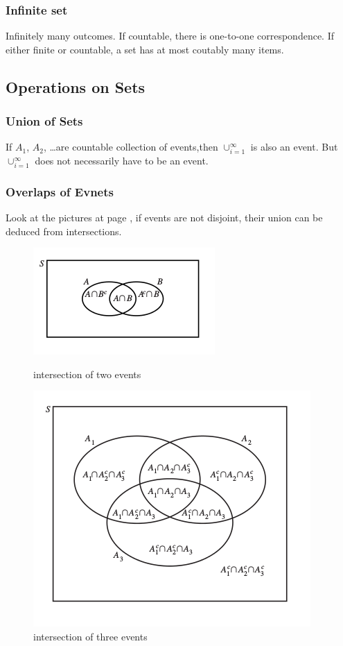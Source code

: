 \documentclass{book}
\begin{document}
			\subsubsection{Infinite set}
			Infinitely many outcomes.  If countable, there 
			is one-to-one correspondence.  If either finite or countable, 
			a set has at most coutably many items.  

		\subsection{Operations on Sets}
			\subsubsection{Union of Sets}
			If $A_1$, $A_2$, \ldots  are countable collection of events,then 
			$\cup_{i=1}^{\infty}$ is also an event.  But $\cup_{i=1}^{\infty}$ 
			does not necessarily have to be an event.  

			\subsubsection{Overlaps of Evnets}
			Look at the pictures at page \pageref{fig:intersection_1}, 
			if events are not disjoint, their union can be deduced from intersections.  
			\begin{figure}[h]
				\centering
				\includegraphics[scale=0.5]{PartitionByTwo}
				\caption{intersection of two events}
				\label{fig:intersection_1}
				\includegraphics[scale=0.5]{PartitionByThree}
				\caption{intersection of three events}
				\label{fig:intersection_2}
			\end{figure}
\end{document}
